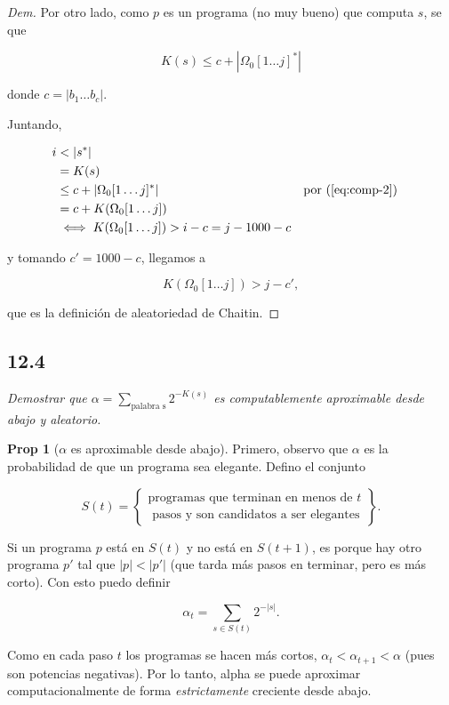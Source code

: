 \documentclass{article}
\theoremstyle{definition} %
\newtheorem*{proposition*}{Prop}
\newcommand{\first}[2]{#2[1 \dots #1]}
\begin{document}
\begin{proof}[Dem]
    Por otro lado, como $p$ es un programa (no muy bueno) que computa $s$, se que

    \begin{equation}\label{eq:comp-2}
         K(s) \leq c + |\first{j}{\Omega_0}^*|
    \end{equation}

    donde $c = |b_1 \dots b_c|$.

    Juntando,

    \begin{align*}
        i
            &< |s^*|\\
            &= K(s)\\
            &\leq c + |\first{j}{\Omega_0}^*|
                &&\text{por (\ref{eq:comp-2})} \\
            &= c + K(\first{j}{\Omega_0}) \\
            &\iff K(\first{j}{\Omega_0}) > i - c = j - 1000 - c
    \end{align*}

     y tomando $c' = 1000 -
c$, llegamos a

    \[
        K(\first{j}{\Omega_0}) > j - c',
    \]
    
    que es la definición de aleatoriedad de Chaitin.

\end{proof}

\subsection*{12.4}

\textit{Demostrar que $\alpha = \sum_{\text{palabra s}} 2^{-K(s)}$ es
computablemente aproximable desde abajo y aleatorio.}

\begin{proposition*}[$\alpha$ es aproximable desde abajo]
    Primero, observo que $\alpha$ es la probabilidad de que un programa sea
    elegante. Defino el conjunto

    \[
        S(t) = \left\{
            \begin{gathered}
            \text{programas que terminan en menos de } t \\
            \text{ pasos y son candidatos a ser elegantes}
            \end{gathered}
        \right\}.
    \]

    Si un programa $p$ está en $S(t)$ y no está en $S(t + 1)$, es porque hay
    otro programa $p'$ tal que $|p| < |p'|$ (que tarda más pasos en terminar,
    pero es más corto). Con esto puedo definir

    \[
        \alpha_t = \sum_{s \in S(t)} 2^{-|s|}.
    \]

    Como en cada paso $t$ los programas se hacen más cortos, $\alpha_t <
    \alpha_{t+1} < \alpha$ (pues son potencias negativas). Por lo tanto, alpha
    se puede aproximar computacionalmente de forma \textit{estrictamente}
    creciente desde abajo.
\end{proposition*}
\end{document}
